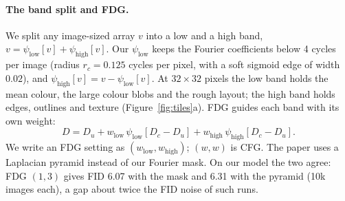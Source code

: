\documentclass[11pt]{article}
\newcommand{\low}{\psi_{\mathrm{low}}}
\newcommand{\high}{\psi_{\mathrm{high}}}
\begin{document}
\paragraph{The band split and FDG.} We split any image-sized array $v$ into a low and a high band,
$v = \low[v] + \high[v]$. Our $\low$ keeps the Fourier coefficients below 4 cycles per image (radius
$r_c = 0.125$ cycles per pixel, with a soft sigmoid edge of width $0.02$), and $\high[v] = v - \low[v]$. At
$32\times32$ pixels the low band holds the mean colour, the large colour blobs and the rough layout; the high band holds
edges, outlines and texture (Figure~\ref{fig:tiles}a). FDG \cite{fdg} guides each band with its own weight:
\begin{equation}
  D = D_u + w_{\mathrm{low}}\, \low[D_c - D_u] + w_{\mathrm{high}}\, \high[D_c - D_u].
  \label{eq:fdg}
\end{equation}
We write an FDG setting as $(w_{\mathrm{low}}, w_{\mathrm{high}})$; $(w, w)$ is CFG. The paper uses a Laplacian
pyramid instead of our Fourier mask. On our model the two agree: FDG $(1,3)$ gives FID 6.07 with the mask and 6.31
with the pyramid (10k images each), a gap about twice the FID noise of such runs.
\end{document}
